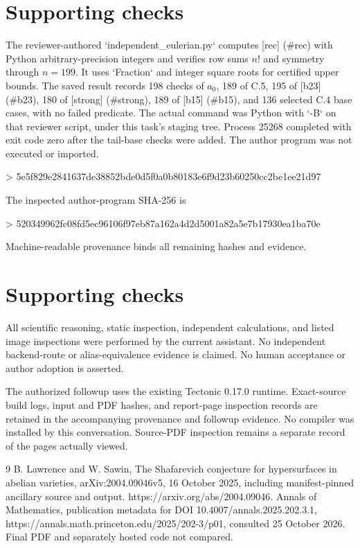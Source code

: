 \documentclass[10pt]{article}
\begin{document}
\section*{Supporting checks}
The reviewer-authored `independent\_eulerian.py` computes [rec] (\#rec) with Python arbitrary-precision integers and verifies row sums \(n!\) and symmetry through \(n=199\). It uses `Fraction` and integer square roots for certified upper bounds. The saved result records 198 checks of \(a_0\), 189 of C.5, 195 of [b23] (\#b23), 180 of [strong] (\#strong), 189 of [b15] (\#b15), and 136 selected C.4 base cases, with no failed predicate. The actual command was Python with `-B` on that reviewer script, under this task’s staging tree. Process 25268 completed with exit code zero after the tail-base checks were added. The author program was not executed or imported.\par
> 5e5f829e2841637de38852bde0d5f0a0b80183e6f9d23b60250cc2be1ee21d97\par
The inspected author-program SHA-256 is\par
> 520349962fc08fd5ec96106f97eb87a162a4d2d5001a82a5e7b17930ea1ba70e\par
Machine-readable provenance binds all remaining hashes and evidence.\par
\section*{Supporting checks}
All scientific reasoning, static inspection, independent calculations, and listed image inspections were performed by the current assistant. No independent backend-route or alias-equivalence evidence is claimed. No human acceptance or author adoption is asserted.\par
The authorized followup uses the existing Tectonic 0.17.0 runtime. Exact-source build logs, input and PDF hashes, and report-page inspection records are retained in the accompanying provenance and followup evidence. No compiler was installed by this conversation. Source-PDF inspection remains a separate record of the pages actually viewed.\par
9 B. Lawrence and W. Sawin, The Shafarevich conjecture for hypersurfaces in abelian varieties, arXiv:2004.09046v5, 16 October 2025, including manifest-pinned ancillary source and output. https://arxiv.org/abs/2004.09046. Annals of Mathematics, publication metadata for DOI 10.4007/annals.2025.202.3.1, https://annals.math.princeton.edu/2025/202-3/p01, consulted 25 October 2026. Final PDF and separately hosted code not compared.\par
\end{document}
